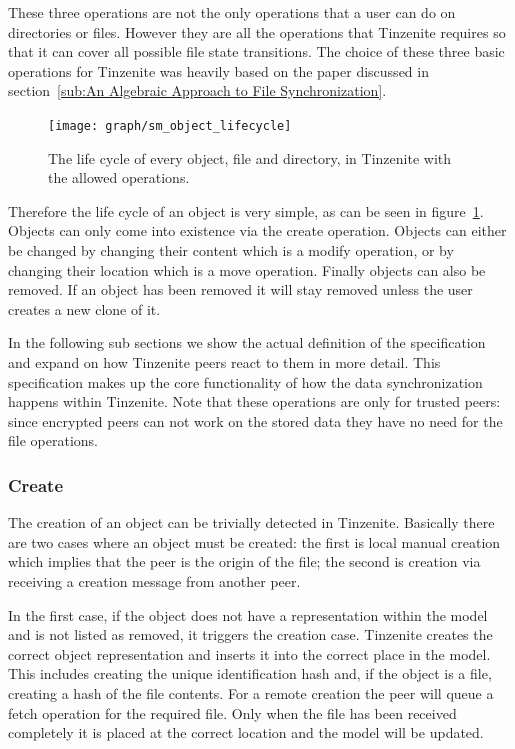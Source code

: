 These three operations are not the only operations that a user can do on directories or files.
However they are all the operations that Tinzenite requires so that it can cover all possible file state transitions.
The choice of these three basic operations for Tinzenite was heavily based on the paper discussed in section~\ref{sub:An Algebraic Approach to File Synchronization}.

\begin{figure}[htp]
\centering
    \texttt{[image: graph/sm\_object\_lifecycle]}
\caption[Object State Diagram]{The life cycle of every object, file and directory, in Tinzenite with the allowed operations.}
\label{diagram:object_operations}
\end{figure}

Therefore the life cycle of an object is very simple, as can be seen in figure~\ref{diagram:object_operations}.
Objects can only come into existence via the create operation.
Objects can either be changed by changing their content which is a modify operation, or by changing their location which is a move operation.
Finally objects can also be removed.
If an object has been removed it will stay removed unless the user creates a new clone of it.

In the following sub sections we show the actual definition of the specification and expand on how Tinzenite peers react to them in more detail.
This specification makes up the core functionality of how the data synchronization happens within Tinzenite.
Note that these operations are only for trusted peers: since encrypted peers can not work on the stored data they have no need for the file operations.

\subsubsection{Create}
\label{subs:Create}

The creation of an object can be trivially detected in Tinzenite.
Basically there are two cases where an object must be created: the first is local manual creation which implies that the peer is the origin of the file; the second is creation via receiving a creation message from another peer.

In the first case, if the object does not have a representation within the model and is not listed as removed, it triggers the creation case.
Tinzenite creates the correct object representation and inserts it into the correct place in the model.
This includes creating the unique identification hash and, if the object is a file, creating a hash of the file contents.
For a remote creation the peer will queue a fetch operation for the required file.
Only when the file has been received completely it is placed at the correct location and the model will be updated.

